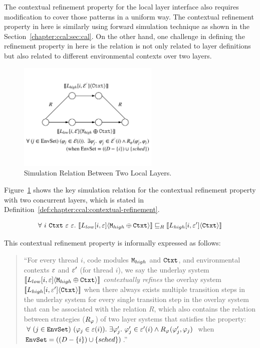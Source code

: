 The contextual refinement property for the local layer interface also requires 
modification to cover those patterns in a uniform way. 
The contextual refinement property in here is similarly using forward simulation technique as shown in the 
Section~\ref{chapter:ccal:sec:cal}.
On the other hand, one challenge in defining the refinement property in here is the relation is not only related to layer definitions but also related to different environmental contexts over two layers. 
\begin{figure}
\begin{center}
\includegraphics[width=0.6\textwidth]{figs/ccal/locallayerrefinement}
\end{center}
\caption{Simulation Relation Between Two Local Layers.}
\label{fig:chapter:ccal:refinement-between-two-layers}
\end{figure}
Figure~\ref{fig:chapter:ccal:refinement-between-two-layers} shows the key simulation relation for 
the contextual refinement property with two concurrent layers, which is stated  in Definition~\ref{def:chapter:ccal:contextual-refinement}.
\begin{definition}
\label{def:chapter:ccal:contextual-refinement}
$$
\forall \ i\  \codeinmath{Ctxt} \ \oracle \ \oracle .\ \sem{L_{low}[i, \oracle]}{\codeinmath{M}_{high} \oplus \codeinmath{Ctxt}} \refines_R \sem{L_{high}[i, \oracle']}{\codeinmath{Ctxt}}
$$
\end{definition}
This contextual refinement property is informally expressed as follows:
\begin{quote}
``For every thread $i$,  code modules ${\mathrm{\texttt{M}}}_{high}$ and  ${\mathrm{\texttt{Ctxt}}}$,  and environmental contexts
  ${\varepsilon}$ and ${\varepsilon}'$ (for thread $i$), we say the underlay system   $[\![{L_{low}[i, {\varepsilon}]} \langle {{\mathrm{\texttt{M}}}_{high} \oplus {\mathrm{\texttt{Ctxt}}}} \rangle]\!]$
     \textit{contextually
 refines} the overlay system $ [\![{L_{high}[i, {\varepsilon}']} \langle {{\mathrm{\texttt{Ctxt}}}} \rangle]\!]$ when there always exists 
 multiple  transition steps in the underlay system for every  single  transition step
  in the overlay system that can be associated with the relation $R$,
which also contains the relation between strategies ($R_{\varphi_{}}$)
 of two layer systems that satisfies the property:
$\forall\ (j \in \codeinmath{EnvSet})\ 
(\strat{j} \in \oracle(i)) .\ \exists \stratp{j} . \ \stratp{j} \in \oracle'(i) \wedge R_{\strat{}}(\stratp{j}, \strat{j})$ when 
${\mathrm{\texttt{EnvSet}}} = ((D - \{ i\}) \cup \{ sched\})$.''
\end{quote}

